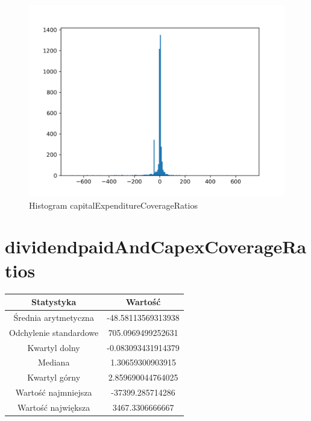 \documentclass{article}
\begin{document}
\begin{figure}[h!]
    \includegraphics[width=\linewidth]{variables/capitalExpenditureCoverageRatios.png}
    \caption{Histogram capitalExpenditureCoverageRatios }
\end{figure}\section{ dividendpaidAndCapexCoverageRatios }

\begin{center}
    \begin{tabular}{|c | c|} 
    \hline
    Statystyka & Wartość \\
    \hline\hline
    Średnia arytmetyczna & -48.58113569313938 \\ 
    \hline
    Odchylenie standardowe & 705.0969499252631 \\
    \hline
    Kwartyl dolny & -0.083093431914379 \\
    \hline
    Mediana & 1.30659300903915 \\
    \hline
    Kwartyl górny & 2.859690044764025 \\
    \hline
    Wartość najmniejsza & -37399.285714286 \\
    \hline
    Wartość największa & 3467.3306666667 \\
    \hline
   \end{tabular}
\end{center}
\end{document}
